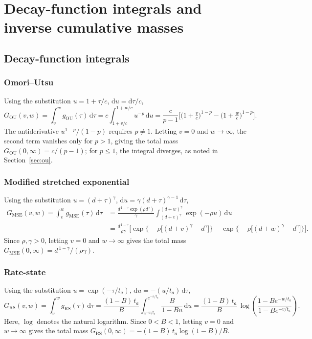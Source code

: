 \pagebreak

\section{Decay-function integrals and inverse cumulative masses} \label{app:maths}
\subsection{Decay-function integrals} \label{app:integrals}
\subsubsection{Omori--Utsu} 

Using the substitution $u = 1 + \tau/c$, $\mathrm{d}u = \mathrm{d}\tau/c$,
\begin{equation*}
G_{\mathrm{OU}}(v,w) = \int_v^w g_{\mathrm{OU}}(\tau)\,\mathrm{d}\tau = c \int_{1+v/c}^{1+w/c} u^{-p}\,\mathrm{d}u
= \frac{c}{p-1}\Big[\big(1+\tfrac{v}{c}\big)^{1-p} - \big(1+\tfrac{w}{c}\big)^{1-p}\Big].
\end{equation*}
The antiderivative $u^{1-p}/(1-p)$ requires $p \neq 1$. Letting $v = 0$ and $w \to \infty$, the second term vanishes only for $p > 1$, giving the total mass $G_{\mathrm{OU}}(0,\infty) = c/(p-1)$; for $p \leq 1$, the integral diverges, as noted in Section~\ref{sec:ou}.


\subsubsection{Modified stretched exponential}
Using the substitution $u = (d+\tau)^{\gamma}$, $\mathrm{d}u = \gamma (d+\tau)^{\gamma - 1}\,\mathrm{d}\tau$,
\begin{align*}
G_{\mathrm{MSE}}(v,w) = \int_v^w g_{\mathrm{MSE}}(\tau)\,\mathrm{d}\tau
&= \frac{d^{\,1-\gamma}\exp(\rho d^{\gamma})}{\gamma} \int_{(d+v)^{\gamma}}^{(d+w)^{\gamma}} \exp(-\rho u)\,\mathrm{d}u \\
&= \frac{d^{\,1-\gamma}}{\rho\gamma}\Big[\exp\big\{-\rho\big[(d+v)^{\gamma} - d^{\gamma}\big]\big\} - \exp\big\{-\rho\big[(d+w)^{\gamma} - d^{\gamma}\big]\big\}\Big].
\end{align*}
Since $\rho, \gamma > 0$, letting $v = 0$ and $w \to \infty$ gives the total mass $G_{\mathrm{MSE}}(0,\infty) = d^{\,1-\gamma}/(\rho\gamma)$.

\subsubsection{Rate-state}
Using the substitution $u = \exp(-\tau/t_a)$, $\mathrm{d}u = -(u/t_a)\,\mathrm{d}\tau$,
 \begin{equation*}
 G_{\mathrm{RS}}(v,w) = \int_v^w g_{\mathrm{RS}}(\tau)\,\mathrm{d}\tau
= \frac{(1-B)\,t_a}{B} \int_{e^{-w/t_a}}^{e^{-v/t_a}} \frac{B}{1 - B u}\, \mathrm{d}u
= \frac{(1-B)\, t_a}{B}\, \log\left(\frac{1 - B e^{-w/t_a}}{1 - B e^{-v/t_a}}\right).
\end{equation*}
Here, $\log$ denotes the natural logarithm. Since $0 < B < 1$, letting $v = 0$ and $w \to \infty$ gives the total mass $G_{\mathrm{RS}}(0,\infty) = -(1-B)\,t_a\log(1-B)/B$.

